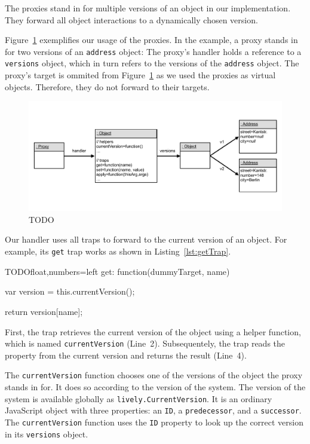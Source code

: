 The proxies stand in for multiple versions of an object in our implementation.
They forward all object interactions to a dynamically chosen version.

Figure~\ref{fig:VersioningProxy} exemplifies our usage of the proxies.
In the example, a proxy stands in for two versions of an \lstinline{address} object: The proxy's handler holds a reference to a \lstinline{versions} object, which in turn refers to the versions of the \lstinline{address} object.
The proxy's target is ommited from Figure~\ref{fig:VersioningProxy} as we used the proxies as virtual objects.
Therefore, they do not forward to their targets.

\begin{figure}[h]
    \centering
    \includegraphics[width=\textwidth]{figures/5_implementation/2_versioningProxy.pdf}
    \caption{TODO}
    \label{fig:VersioningProxy}
\end{figure}

Our handler uses all traps to forward to the current version of an object.
For example, its \lstinline{get} trap works as shown in Listing~\ref{lst:getTrap}.

\begin{code}{TODO}{float,numbers=left}
get: function(dummyTarget, name) {
    var version = this.currentVersion();
    
    return version[name];
}
\end{code}
\iffalse
\end{verbatim}\fi

First, the trap retrieves the current version of the object using a helper function, which is named \lstinline{currentVersion} (Line~2).
Subsequentely, the trap reads the property from the current version and returns the result (Line~4).

The \lstinline{currentVersion} function chooses one of the versions of the object the proxy stands in for.
It does so according to the version of the system.
The version of the system is available globally as \lstinline{lively.CurrentVersion}.
It is an ordinary JavaScript object with three properties: an \lstinline{ID}, a \lstinline{predecessor}, and a \lstinline{successor}.
The \lstinline{currentVersion} function uses the \lstinline{ID} property to look up the correct version in its \lstinline{versions} object.

